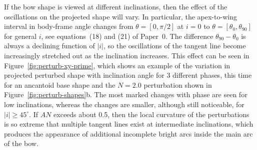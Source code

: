 If the bow shape is viewed at different inclinations, then the effect
of the oscillations on the projected shape will vary.  In particular,
the apex-to-wing interval in body-frame angle changes from
\(\theta = [0, \pi/2]\) at \(i = 0\) to
\(\theta = [\theta_0, \theta_{90}]\) for general \(i\), see equations~(18) and (21)
of Paper~0.  The difference \(\theta_{90} - \theta_0\) is always a declining
function of \(|i|\), so the oscillations of the tangent line become
increasingly stretched out as the inclination increases.  This effect
can be seen in Figure~\ref{fig:perturb-xy-prime}, which shows an
example of the variation in projected perturbed shape with inclination
angle for 3 different phases, this time for an ancantoid base shape
and the \(N = 2.0\) perturbation shown in
Figure~\ref{fig:perturb-shapes}b.  The most marked changes with phase
are seen for low inclinations, whereas the changes are smaller,
although still noticeable, for \(|i| \ge 45^\circ\). If \(A N\) exceeds
about 0.5, then the local curvature of the perturbations is so extreme
that multiple tangent lines exist at intermediate inclinations, which
produces the appearance of additional incomplete bright arcs inside
the main arc of the bow.


